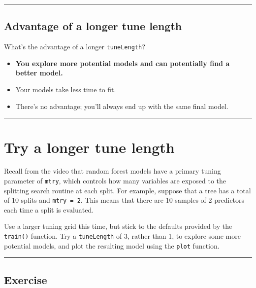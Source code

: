 \documentclass[
]{book}
\begin{document}
\begin{center}\rule{0.5\linewidth}{0.5pt}\end{center}

\hypertarget{advantage-of-a-longer-tune-length}{%
\subsection*{Advantage of a longer tune length}\label{advantage-of-a-longer-tune-length}}

What's the advantage of a longer \texttt{tuneLength}?

\begin{itemize}
\item
  \textbf{You explore more potential models and can potentially find a better model.}
\item
  Your models take less time to fit.
\item
  There's no advantage; you'll always end up with the same final model.
\end{itemize}

\begin{center}\rule{0.5\linewidth}{0.5pt}\end{center}

\hypertarget{try-a-longer-tune-length}{%
\section{Try a longer tune length}\label{try-a-longer-tune-length}}

Recall from the video that random forest models have a primary tuning parameter of \texttt{mtry}, which controls how many variables are exposed to the splitting search routine at each split. For example, suppose that a tree has a total of 10 splits and \texttt{mtry\ =\ 2}. This means that there are 10 samples of 2 predictors each time a split is evaluated.

Use a larger tuning grid this time, but stick to the defaults provided by the \texttt{train()} function. Try a \texttt{tuneLength} of 3, rather than 1, to explore some more potential models, and plot the resulting model using the \texttt{plot} function.

\begin{center}\rule{0.5\linewidth}{0.5pt}\end{center}

\hypertarget{exercise-18}{%
\subsection*{Exercise}\label{exercise-18}}
\end{document}
